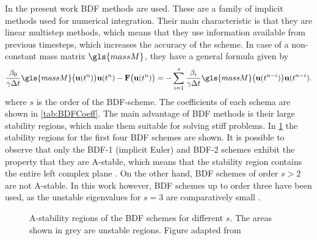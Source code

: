 In the present work BDF methods are used. These are a family of implicit methods used for numerical integration. Their main characteristic is that they are linear multistep methods, which means that they use information available from previous timesteps, which increases the accuracy of the scheme. In case of a non-constant mass matrix $\gls{massM}$, they have a general formula given by
\begin{equation}
	\frac{\beta_0}{\gamma\Delta t}\gls{massM}\bigl(\vec{u}(t^n)\bigr)\vec{u}(t^n)- \vec{F}\bigl(\vec{u}(t^n)\bigr) = - \sum_{i=1}^s \frac{\beta_i}{\gamma \Delta t}\gls{massM}\bigl(\vec{u}(t^{n-i})\bigr)\vec{u}(t^{n-i}).\label{eq:BDFDiscretization}
\end{equation}
where $s$ is the order of the BDF-scheme.  The coefficients of each schema are shown in \cref{tab:BDFCoeff}. The main advantage of BDF methods is their large stability regions, which make them suitable for solving stiff problems.  In \cref{Fig:AStability} the stability regions for the first four BDF schemes are shown. It is possible to observe that only the BDF-1 (implicit Euler) and BDF-2 schemes exhibit the property that they are A-stable, which means that the stability region contains the entire left complex plane \parencite{dahlquistSpecialStabilityProblem1963}. On the other hand, BDF schemes of order $s > 2$ are not A-stable. In this work however, BDF schemes up to order three have been used, as the unstable eigenvalues for $s=3$ are comparatively small \parencite{smudamartinDirectNumericalSimulation2021}.


\begin{figure}
	\centering
	\pgfplotsset{width=0.5\textwidth}
	\caption[{A-stability regions of the BDF schemes for different order $s$. The areas shown in grey are unstable regions.} ]{A-stability regions of the BDF schemes for different $s$. The areas shown in grey are unstable regions. Figure adapted from \parencite{kikkerHighOrderEXtendedDiscontinuous2020}} 
	\label{Fig:AStability}
\end{figure}






